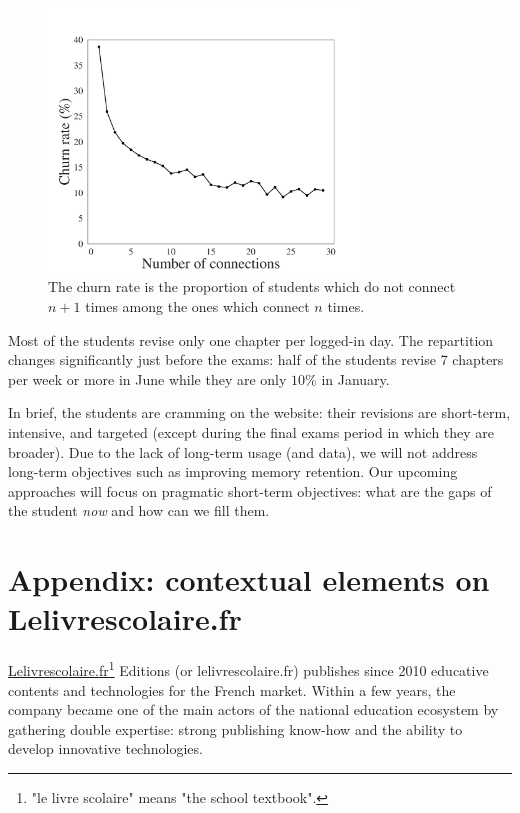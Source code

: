 \begin{figure}[!ht]
\centering
\includegraphics[clip, width= 0.75\textwidth]{2literature/fig/churn.pdf}
\caption{The churn rate is the proportion of students which do not connect $n+1$ times among the ones which connect $n$ times.}
\label{fig:churn}
\end{figure}

Most of the students revise only one chapter per logged-in day. The repartition changes significantly just before the exams: half of the students revise 7 chapters per week or more in June while they are only $10\%$ in January. 

In brief, the students are cramming on the website: their revisions are short-term, intensive, and targeted (except during the final exams period in which they are broader). Due to the lack of long-term usage (and data), we will not address long-term objectives such as improving memory retention. Our upcoming approaches will focus on pragmatic short-term objectives: what are the gaps of the student \emph{now} and how can we fill them.


\section{Appendix: contextual elements on Lelivrescolaire.fr}
\label{sec:lls}
\href{https://www.lelivrescolaire.fr}{Lelivrescolaire.fr}\footnote{"le livre scolaire" means "the school textbook".} Editions (or lelivrescolaire.fr) publishes since 2010 educative contents and technologies for the French market. Within a few years, the company became one of the main actors of the national education ecosystem by gathering double expertise: strong publishing know-how and the ability to develop innovative technologies. 


